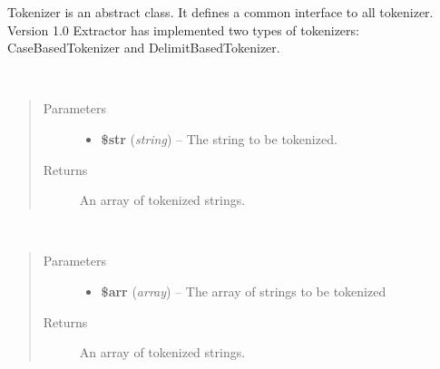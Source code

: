 \documentclass[letterpaper,10pt,english]{sphinxmanual}
\begin{document}
\begin{fulllineitems}
\label{docs/api:Tokenizer}
Tokenizer is an abstract class. It defines a common interface to all tokenizer. Version 1.0 Extractor has implemented two types of tokenizers: CaseBasedTokenizer and DelimitBasedTokenizer.

\begin{fulllineitems}
\label{docs/api:Tokenizer::tokenizeString}~\begin{quote}\begin{description}
\item[{Parameters}] \leavevmode\begin{itemize}
\item {} 
\textbf{\$str} (\emph{string}) -- The string to be tokenized.

\end{itemize}

\item[{Returns}] \leavevmode
An array of tokenized strings.

\end{description}\end{quote}

\end{fulllineitems}


\begin{fulllineitems}
\label{docs/api:Tokenizer::tokenizeArrayOfStrings}~\begin{quote}\begin{description}
\item[{Parameters}] \leavevmode\begin{itemize}
\item {} 
\textbf{\$arr} (\emph{array}) -- The array of strings to be tokenized

\end{itemize}

\item[{Returns}] \leavevmode
An array of tokenized strings.

\end{description}\end{quote}

\end{fulllineitems}


\end{fulllineitems}
\end{document}
